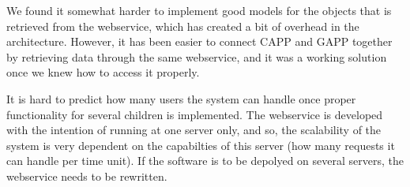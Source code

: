 We found it somewhat harder to implement good models 
for the objects that is retrieved from the webservice, which has created a bit of overhead in the architecture.
However, it has been easier to connect CAPP and GAPP together by retrieving data
through the same webservice, and it was a working solution once we knew how to access it properly. 


It is hard to predict how many users the system can handle once proper functionality for several children is implemented. 
The webservice is developed with the intention of running at one server only, and so, the scalability of the system 
is very dependent
on the capabilties of this server (how many requests it can handle per time unit). If the software is to be depolyed on 
several servers, the webservice needs to be rewritten. 

